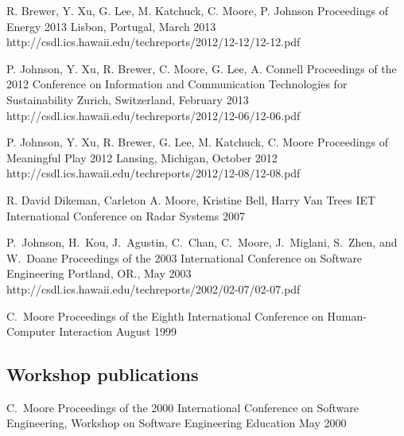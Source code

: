 \documentclass[11pt,letterpaper,sans]{moderncv} %
\begin{document}
          {R. Brewer, Y. Xu, G. Lee, M. Katchuck, C. Moore, P. Johnson}
          {Proceedings of Energy 2013}
          {Lisbon, Portugal, March 2013}
          {http://csdl.ics.hawaii.edu/techreports/2012/12-12/12-12.pdf}

          {P. Johnson, Y. Xu, R. Brewer,  C. Moore,  G. Lee, A. Connell}
          {Proceedings of the 2012 Conference on Information and Communication Technologies for Sustainability}
          {Zurich, Switzerland, February 2013}
          {http://csdl.ics.hawaii.edu/techreports/2012/12-06/12-06.pdf}

          {P. Johnson, Y. Xu, R. Brewer, G. Lee, M. Katchuck, C. Moore}
          {Proceedings of Meaningful Play 2012}
          {Lansing, Michigan, October 2012}
          {http://csdl.ics.hawaii.edu/techreports/2012/12-08/12-08.pdf}

          {R. David Dikeman, Carleton A. Moore, Kristine Bell, Harry
            Van Trees}
          {IET International Conference on Radar Systems}
          {2007}
          {}

          {P.~Johnson, H.~Kou, J.~Agustin, C.~Chan, C.~Moore, J.~Miglani, S.~Zhen, and W.~Doane}
          {Proceedings of the 2003 International Conference on Software Engineering}
          {Portland, OR., May 2003}
          {http://csdl.ics.hawaii.edu/techreports/2002/02-07/02-07.pdf}

          {C.~Moore}
          {Proceedings of the Eighth International Conference on
            Human-Computer Interaction}
          {August 1999}

\subsection{Workshop publications}

          {C.~Moore}
          {Proceedings of the 2000 International Conference on
            Software Engineering, Workshop on Software Engineering
            Education}
          {May 2000}
\end{document}
